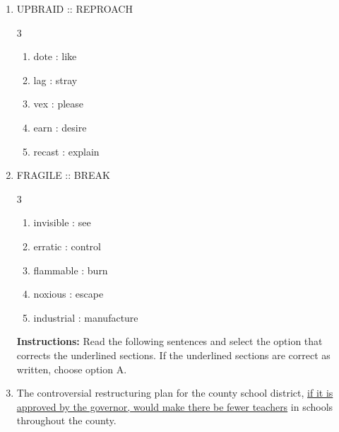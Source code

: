 \documentclass[12pt]{article}
\begin{document}
\begin{enumerate}[label=\textbf{\arabic*.}]
\begin{multicols}{3}
\begin{enumerate}[label=(\Alph*)]
\item feckless : succeed

\item illusory : exist

\item pliant : yield

\end{enumerate}

\end{multicols}

\item UPBRAID :: REPROACH

\begin{multicols}{3}

\begin{enumerate}[label=(\Alph*)]

\item dote : like

\item lag : stray

\item vex : please

\item earn : desire

\item recast : explain

\end{enumerate}

\end{multicols}

\item FRAGILE :: BREAK

\begin{multicols}{3}

\begin{enumerate}[label=(\Alph*)]

\item invisible : see

\item erratic : control

\item flammable : burn

\item noxious : escape

\item industrial : manufacture

\end{enumerate}

\end{multicols}
\noindent\textbf{Instructions:} Read the following sentences and select the option that corrects the underlined sections. If the underlined sections are correct as written, choose option A.
\item The controversial restructuring plan for the county school district, \ul{if it is approved by the governor, would make there be fewer teachers} in schools throughout the county.


\end{enumerate}
\end{document}
